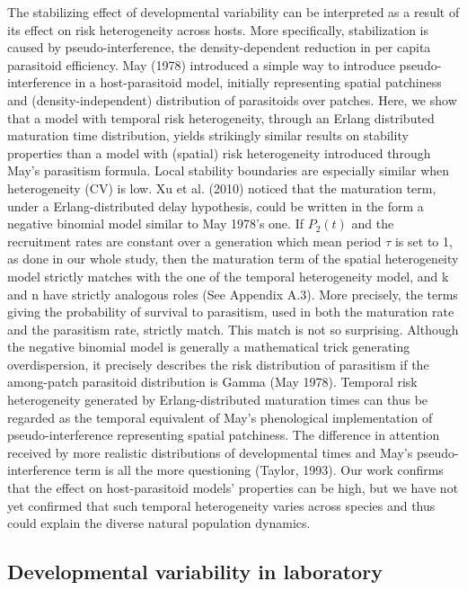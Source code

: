 \documentclass[12pt,a4paper,onecolumn]{article}
\begin{document}
\tabto{1 cm} The stabilizing effect of developmental variability can be interpreted as a result of its effect on risk heterogeneity across hosts. More specifically, stabilization is caused by pseudo-interference, the density-dependent reduction in per capita parasitoid efficiency. May (1978) introduced a simple way to introduce pseudo-interference in a host-parasitoid model, initially representing spatial patchiness and (density-independent) distribution of parasitoids over patches. 
\tabto{1 cm} Here, we show that a model with temporal risk heterogeneity, through an Erlang distributed maturation time distribution, yields strikingly similar results on stability properties than a model with (spatial) risk heterogeneity introduced through May's parasitism formula. Local stability boundaries are especially similar when heterogeneity (CV) is low. Xu et al. (2010) noticed that the maturation term, under a Erlang-distributed delay hypothesis, could be written in the form a negative binomial model similar to May 1978's one.  If $P_2(t)$ and the recruitment rates are constant over a generation which mean period $\tau$ is set to 1, as done in our whole study, then the maturation term of the spatial heterogeneity model strictly matches with the one of the temporal heterogeneity model, and k and n have strictly analogous roles (See Appendix A.3). More precisely, the terms giving the probability of survival to parasitism, used in both the maturation rate and the parasitism rate, strictly match. This match is not so surprising. Although the negative binomial model is generally a mathematical trick generating overdispersion, it precisely describes the risk distribution of parasitism if the among-patch parasitoid distribution is Gamma (May 1978). Temporal risk heterogeneity generated by Erlang-distributed maturation times can thus be regarded as the temporal equivalent of May's phenological implementation of pseudo-interference representing spatial patchiness. The difference in attention received by more realistic distributions of developmental times and May's pseudo-interference term is all the more questioning (Taylor, 1993). Our work confirms that the effect on host-parasitoid models' properties can be high, but we have not yet confirmed that such temporal heterogeneity varies across species and thus could explain the diverse natural population dynamics.

\subsection{Developmental variability in laboratory}
\end{document}
